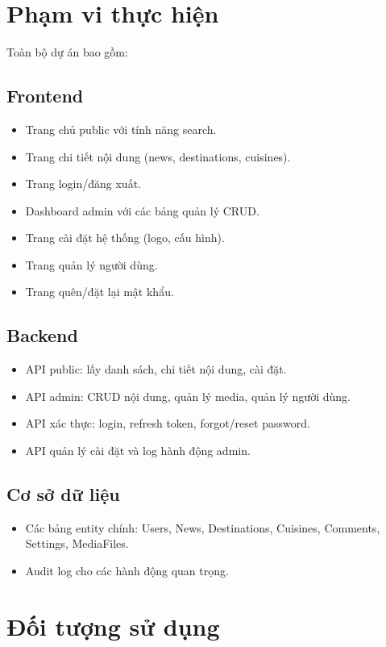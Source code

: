 \documentclass[12pt,a4paper,oneside]{report}
\begin{document}
\section{Phạm vi thực hiện}

Toàn bộ dự án bao gồm:

\subsection{Frontend}
\begin{itemize}[itemsep=2pt]
  \item Trang chủ public với tính năng search.
  \item Trang chi tiết nội dung (news, destinations, cuisines).
  \item Trang login/đăng xuất.
  \item Dashboard admin với các bảng quản lý CRUD.
  \item Trang cài đặt hệ thống (logo, cấu hình).
  \item Trang quản lý người dùng.
  \item Trang quên/đặt lại mật khẩu.
\end{itemize}

\subsection{Backend}
\begin{itemize}[itemsep=2pt]
  \item API public: lấy danh sách, chi tiết nội dung, cài đặt.
  \item API admin: CRUD nội dung, quản lý media, quản lý người dùng.
  \item API xác thực: login, refresh token, forgot/reset password.
  \item API quản lý cài đặt và log hành động admin.
\end{itemize}

\subsection{Cơ sở dữ liệu}
\begin{itemize}[itemsep=2pt]
  \item Các bảng entity chính: Users, News, Destinations, Cuisines, Comments, Settings, MediaFiles.
  \item Audit log cho các hành động quan trọng.
\end{itemize}

\section{Đối tượng sử dụng}
\end{document}
